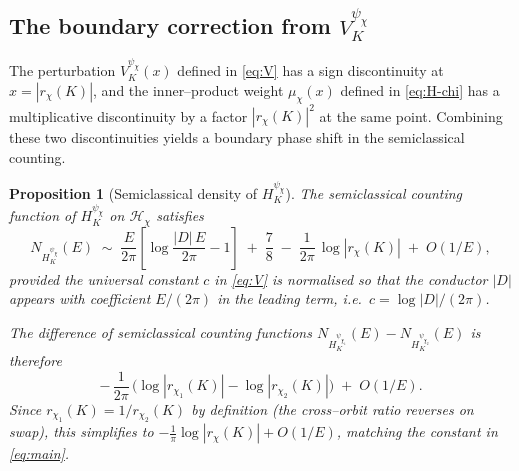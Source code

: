 \documentclass[11pt]{amsart}
\newtheorem{proposition}[theorem]{Proposition}
\theoremstyle{definition}
\theoremstyle{remark}
\begin{document}
\subsection{The boundary correction from \(V_K^{\psi_\chi}\)}
\label{ssec:bdy-correction}
The perturbation \(V_K^{\psi_\chi}(x)\) defined in \eqref{eq:V} has a
sign discontinuity at \(x = |r_\chi(K)|\), and the inner--product
weight \(\mu_\chi(x)\) defined in \eqref{eq:H-chi} has a multiplicative
discontinuity by a factor \(|r_\chi(K)|^2\) at the same point.
Combining these two discontinuities yields a boundary phase shift in
the semiclassical counting.

\begin{proposition}[Semiclassical density of \(H_K^{\psi_\chi}\)]
\label{prop:semi-density}
The semiclassical counting function of \(H_K^{\psi_\chi}\) on
\(\mathcal H_\chi\) satisfies
\begin{equation}\label{eq:N-chi-semi}
   N_{H_K^{\psi_\chi}}(E)
   \;\sim\;
   \frac{E}{2\pi}\!\left[ \log\frac{|D|\,E}{2\pi} - 1 \right]
   \;+\; \frac{7}{8}
   \;-\;
   \frac{1}{2\pi}\,\log|r_\chi(K)|
   \;+\; O(1/E) ,
\end{equation}
provided the universal constant \(c\) in \eqref{eq:V} is normalised so
that the conductor \(|D|\) appears with coefficient \(E/(2\pi)\) in the
leading term, i.e.\ \(c = \log|D|/(2\pi)\).

The difference of semiclassical counting functions
\(N_{H_K^{\psi_{\chi_1}}}(E) - N_{H_K^{\psi_{\chi_2}}}(E)\)
is therefore
\begin{equation}\label{eq:Delta-N-semi}
   -\,\frac{1}{2\pi}\,\bigl( \log|r_{\chi_1}(K)| - \log|r_{\chi_2}(K)| \bigr)
   \;+\; O(1/E) .
\end{equation}
Since \(r_{\chi_1}(K) = 1/r_{\chi_2}(K)\) by definition (the
cross--orbit ratio reverses on swap), this simplifies to
\(-\tfrac{1}{\pi}\log|r_\chi(K)| + O(1/E)\), matching the constant in
\eqref{eq:main}.
\end{proposition}
\end{document}
